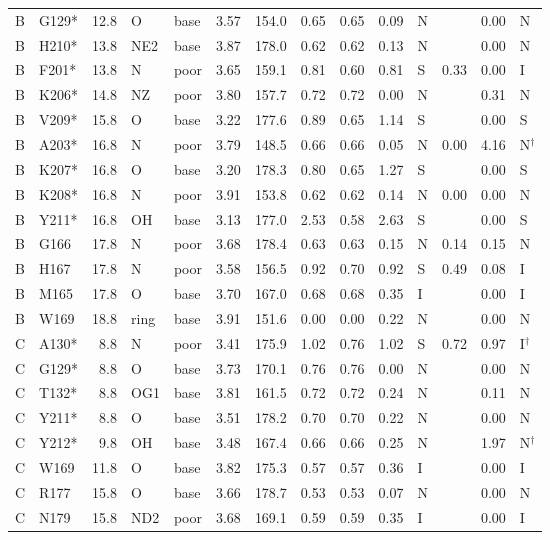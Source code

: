 {\begin{longtable}{llrllrrrrrlrrl}
B & G129* & 12.8 & O & base & 3.57 & 154.0 & 0.65 & 0.65 & 0.09 & N &  & 0.00 & N\\
B & H210* & 13.8 & NE2 & base & 3.87 & 178.0 & 0.62 & 0.62 & 0.13 & N &  & 0.00 & N\\
B & F201* & 13.8 & N & poor & 3.65 & 159.1 & 0.81 & 0.60 & 0.81 & S & 0.33 & 0.00 & I\\
B & K206* & 14.8 & NZ & poor & 3.80 & 157.7 & 0.72 & 0.72 & 0.00 & N &  & 0.31 & N\\
B & V209* & 15.8 & O & base & 3.22 & 177.6 & 0.89 & 0.65 & 1.14 & S &  & 0.00 & S\\
B & A203* & 16.8 & N & poor & 3.79 & 148.5 & 0.66 & 0.66 & 0.05 & N & 0.00 & 4.16 & N$^\dagger$\\
B & K207* & 16.8 & O & base & 3.20 & 178.3 & 0.80 & 0.65 & 1.27 & S &  & 0.00 & S\\
B & K208* & 16.8 & N & poor & 3.91 & 153.8 & 0.62 & 0.62 & 0.14 & N & 0.00 & 0.00 & N\\
B & Y211* & 16.8 & OH & base & 3.13 & 177.0 & 2.53 & 0.58 & 2.63 & S &  & 0.00 & S\\
B & G166 & 17.8 & N & poor & 3.68 & 178.4 & 0.63 & 0.63 & 0.15 & N & 0.14 & 0.15 & N\\
B & H167 & 17.8 & N & poor & 3.58 & 156.5 & 0.92 & 0.70 & 0.92 & S & 0.49 & 0.08 & I\\
B & M165 & 17.8 & O & base & 3.70 & 167.0 & 0.68 & 0.68 & 0.35 & I &  & 0.00 & I\\
B & W169 & 18.8 & ring & base & 3.91 & 151.6 & 0.00 & 0.00 & 0.22 & N &  & 0.00 & N\\
C & A130* & 8.8 & N & poor & 3.41 & 175.9 & 1.02 & 0.76 & 1.02 & S & 0.72 & 0.97 & I$^\dagger$\\
C & G129* & 8.8 & O & base & 3.73 & 170.1 & 0.76 & 0.76 & 0.00 & N &  & 0.00 & N\\
C & T132* & 8.8 & OG1 & base & 3.81 & 161.5 & 0.72 & 0.72 & 0.24 & N &  & 0.11 & N\\
C & Y211* & 8.8 & O & base & 3.51 & 178.2 & 0.70 & 0.70 & 0.22 & N &  & 0.00 & N\\
C & Y212* & 9.8 & OH & base & 3.48 & 167.4 & 0.66 & 0.66 & 0.25 & N &  & 1.97 & N$^\dagger$\\
C & W169 & 11.8 & O & base & 3.82 & 175.3 & 0.57 & 0.57 & 0.36 & I &  & 0.00 & I\\
C & R177 & 15.8 & O & base & 3.66 & 178.7 & 0.53 & 0.53 & 0.07 & N &  & 0.00 & N\\
C & N179 & 15.8 & ND2 & poor & 3.68 & 169.1 & 0.59 & 0.59 & 0.35 & I &  & 0.00 & I\\

\end{longtable}}
